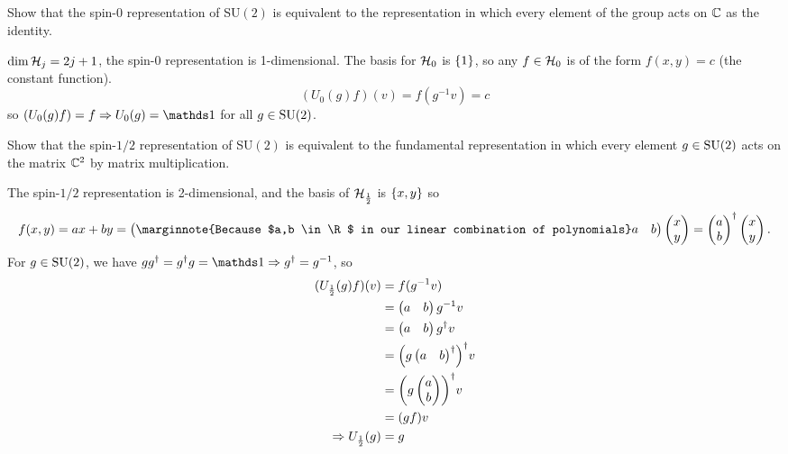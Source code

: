 \documentclass[10pt]{article}
\begin{document}
\begin{example}
	Show that the spin-$0$ representation of SU$(2)$ is equivalent to the  representation in which every element of the group acts on $\mathbb{C}$ as the identity.
\end{example}
\sol $\dim\mathcal{H}_j = 2j+1$, the spin-$0$ representation is 1-dimensional. The basis for $\mathcal{H}_0$ is $\lbrace1\rbrace$, so any $f \in \mathcal{H}_0$ is of the form $f(x,y) = c$ (the constant function).
$$
(U_0(g)f)(v) = f(g^{-1}v) = c
$$
so $(U_0(g)f)=f \Rightarrow U_0(g) = \id$ for all $g \in \text{SU}(2)$.


\begin{example}\label{b2e22}
	Show that the spin-$1/2$ representation of SU$(2)$ is equivalent to the fundamental representation in which every element $g \in \text{SU}(2)$ acts on the matrix $\mathbb{C}^2$ by matrix multiplication.
\end{example}
\sol The spin-$1/2$ representation is 2-dimensional, and the basis of $\mathcal{H}_\frac12$ is $\lbrace x,y\rbrace$ so
$$
f(x,y)=ax+by = \begin{pmatrix}\marginnote{Because $a,b \in \R$ in our linear combination of polynomials}
	a&b
\end{pmatrix}\begin{pmatrix}
	x\\y
\end{pmatrix} = \begin{pmatrix}
	a\\b
\end{pmatrix}^\dag\begin{pmatrix}
	x\\y
\end{pmatrix}.
$$
For $g\in\text{SU}(2)$, we have $gg^\dag=g^\dag g = \id \Rightarrow g^\dag = g^{-1}$, so
$$
\begin{aligned}
	(U_\frac12(g)f)(v) &= f(g^{-1}v)\\
	&= \begin{pmatrix}
		a&b
	\end{pmatrix}g^{-1}v\\
	&= \begin{pmatrix}
		a&b
	\end{pmatrix}g^\dag v\\
	&= \p*{g\begin{pmatrix}
		a&b
	\end{pmatrix}^\dag}^\dag v\\
	&= \p*{g\begin{pmatrix}
		a\\b
	\end{pmatrix}}^\dag v\\
	&= (gf) v\\
\Rightarrow U_\frac12(g) &= g
\end{aligned}
$$
\end{document}

